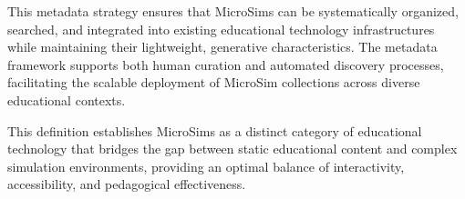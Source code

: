 This metadata strategy ensures that MicroSims can be systematically organized, searched, and integrated into existing educational technology infrastructures while maintaining their lightweight, generative characteristics. The metadata framework supports both human curation and automated discovery processes, facilitating the scalable deployment of MicroSim collections across diverse educational contexts.

This definition establishes MicroSims as a distinct category of educational technology that bridges the gap between static educational content and complex simulation environments, providing an optimal balance of interactivity, accessibility, and pedagogical effectiveness.
